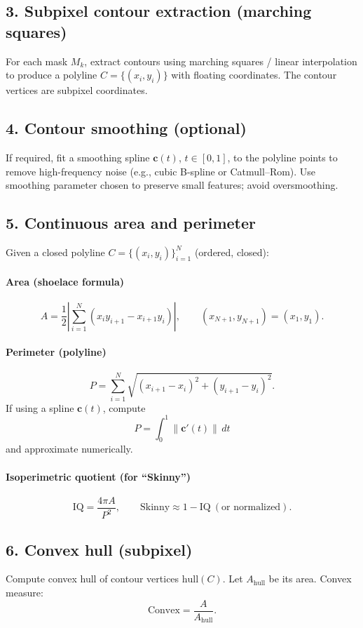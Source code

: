 \documentclass[11pt]{article}
\begin{document}
\subsection{3. Subpixel contour extraction (marching squares)}
For each mask \(M_k\), extract contours using marching squares / linear interpolation to produce a polyline \(C = \{(x_i,y_i)\}\) with floating coordinates. The contour vertices are subpixel coordinates.

\subsection{4. Contour smoothing (optional)}
If required, fit a smoothing spline \(\mathbf{c}(t)\), \(t\in[0,1]\), to the polyline points to remove high-frequency noise (e.g., cubic B-spline or Catmull--Rom).
Use smoothing parameter chosen to preserve small features; avoid oversmoothing.

\subsection{5. Continuous area and perimeter}
Given a closed polyline \(C=\{(x_i,y_i)\}_{i=1}^N\) (ordered, closed):
\paragraph{Area (shoelace formula)}
\[
A = \frac{1}{2}\left| \sum_{i=1}^N (x_i y_{i+1} - x_{i+1} y_i)\right|,\qquad (x_{N+1},y_{N+1})=(x_1,y_1).
\]
\paragraph{Perimeter (polyline)}
\[
P = \sum_{i=1}^{N} \sqrt{(x_{i+1}-x_i)^2 + (y_{i+1}-y_i)^2}.
\]
If using a spline \(\mathbf{c}(t)\), compute
\[
P = \int_{0}^{1} \|\mathbf{c}'(t)\|\,dt
\]
and approximate numerically.

\paragraph{Isoperimetric quotient (for ``Skinny'')}
\[
\mathrm{IQ} = \frac{4\pi A}{P^2},\qquad \text{Skinny}\approx 1-\mathrm{IQ}\ (\text{or normalized}).
\]

\subsection{6. Convex hull (subpixel)}
Compute convex hull of contour vertices \(\mathrm{hull}(C)\). Let \(A_{\mathrm{hull}}\) be its area. Convex measure:
\[
\text{Convex} = \frac{A}{A_{\mathrm{hull}}}.
\]
\end{document}
